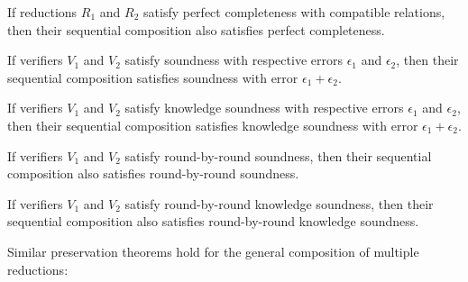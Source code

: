 \begin{theorem}
    \label{thm:perfect_completeness_append}
    If reductions $R_1$ and $R_2$ satisfy perfect completeness with compatible relations, then their sequential composition also satisfies perfect completeness.
\end{theorem}

\begin{theorem}
    \label{thm:soundness_append}
    If verifiers $V_1$ and $V_2$ satisfy soundness with respective errors $\epsilon_1$ and $\epsilon_2$, then their sequential composition satisfies soundness with error $\epsilon_1 + \epsilon_2$.
\end{theorem}

\begin{theorem}
    \label{thm:knowledge_soundness_append}
    If verifiers $V_1$ and $V_2$ satisfy knowledge soundness with respective errors $\epsilon_1$ and $\epsilon_2$, then their sequential composition satisfies knowledge soundness with error $\epsilon_1 + \epsilon_2$.
\end{theorem}

\begin{theorem}
    \label{thm:rbr_soundness_append}
    If verifiers $V_1$ and $V_2$ satisfy round-by-round soundness, then their sequential composition also satisfies round-by-round soundness.
\end{theorem}

\begin{theorem}
    \label{thm:rbr_knowledge_soundness_append}
    If verifiers $V_1$ and $V_2$ satisfy round-by-round knowledge soundness, then their sequential composition also satisfies round-by-round knowledge soundness.
\end{theorem}

Similar preservation theorems hold for the general composition of multiple reductions:

\begin{theorem}
    \label{thm:completeness_compose}
\end{theorem}

